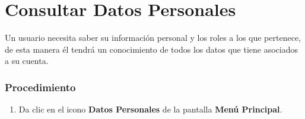 \section{Consultar Datos Personales}

Un usuario necesita saber su información personal y los roles a los que pertenece, de esta manera él tendrá un conocimiento de todos los datos que tiene asociados a su cuenta.

\subsubsection{Procedimiento}
\begin{enumerate}
	
	\item Da clic en el icono \textbf{Datos Personales} de la pantalla \textbf{Menú Principal}.


\end{enumerate}
